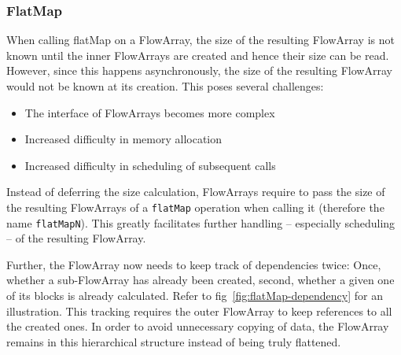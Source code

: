\documentclass[runningheads,a4paper,fleqn]{llncs}
\begin{document}
\subsubsection{FlatMap}
\label{sssec:flatMapN}

When calling flatMap on a FlowArray, the size of the resulting
FlowArray is not known until the inner FlowArrays are created and
hence their size can be read. However, since this happens
asynchronously, the size of the resulting FlowArray would not be known
at its creation. This poses several challenges:

\begin{itemize}
\item The interface of FlowArrays becomes more complex
\item Increased difficulty in memory allocation
\item Increased difficulty in scheduling of subsequent calls
\end{itemize}

Instead of deferring the size calculation, FlowArrays require to pass
the size of the resulting FlowArrays of a \texttt{flatMap} operation
when calling it (therefore the name \texttt{flatMapN}). This greatly 
facilitates further handling -- especially scheduling -- of the
resulting FlowArray.

Further, the FlowArray now needs to keep track of dependencies twice:
Once, whether a sub-FlowArray has already been created, second,
whether a given one of its blocks is already calculated. Refer to
fig~\ref{fig:flatMap-dependency} for an illustration. This tracking
requires the outer FlowArray to keep references to all the created
ones. In order to avoid unnecessary copying of data, the FlowArray
remains in this hierarchical structure instead of being truly
flattened.
\end{document}
